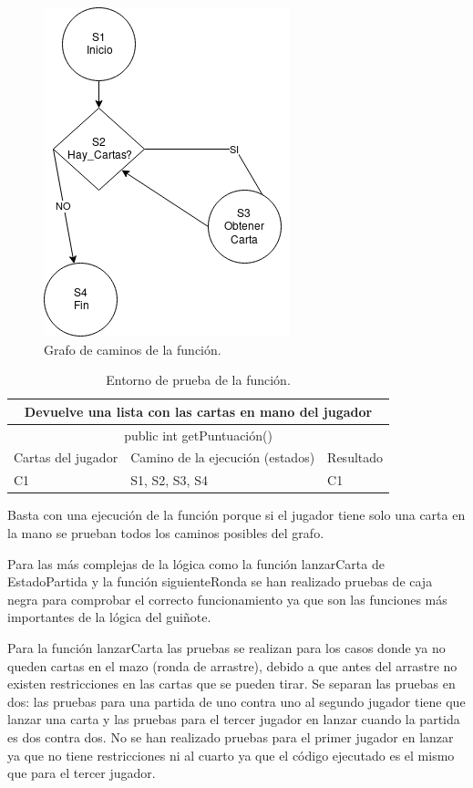 \begin{figure}[H]
		\centering
		\includegraphics[scale=0.8]{figuras/getCartas.png}
		\caption{Grafo de caminos de la función.}
	\end{figure}

\begin{table}[htb]
\centering
\begin{tabular}{|l|l|l|}
\hline
\multicolumn{3}{|c|}{Devuelve una lista con las cartas en mano del jugador} \\ \hline
\multicolumn{3}{|c|}{public int getPuntuación()} \\ \hline
Cartas del jugador & Camino de la ejecución (estados) & Resultado \\ \hline	
C1 & S1, S2, S3, S4 & C1 \\ \hline
 \end{tabular}
 \caption{Entorno de prueba de la función.}
\label{}
\end{table}

Basta con una ejecución de la función porque si el jugador tiene solo una carta en la mano se prueban todos los caminos posibles del grafo.

Para las más complejas de la lógica como la función lanzarCarta de EstadoPartida y la función siguienteRonda se han realizado pruebas de caja negra para comprobar el correcto funcionamiento ya que son las funciones más importantes de la lógica del guiñote.

Para la función lanzarCarta las pruebas se realizan para los casos donde ya no queden cartas en el mazo (ronda de arrastre), debido a que antes del arrastre no existen restricciones en las cartas que se pueden tirar. Se separan las pruebas en dos: las pruebas para una partida de uno contra uno al segundo jugador tiene que lanzar una carta y las pruebas para el tercer jugador en lanzar cuando la partida es dos contra dos. No se han realizado pruebas para el primer jugador en lanzar ya que no tiene restricciones ni al cuarto ya que el código ejecutado es el mismo que para el tercer jugador.

